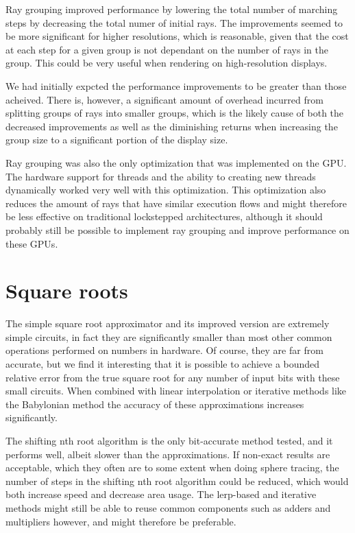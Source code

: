 			Ray grouping improved performance by lowering the total number of
			marching steps by decreasing the total numer of initial rays. The
			improvements seemed to be more significant for higher resolutions,
			which is reasonable, given that the cost at each step for a given
			group is not dependant on the number of rays in the group. This 
			could be very useful when rendering on high-resolution displays.
			
			We had initially expcted the performance improvements to be greater
			than those acheived. There is, however, a significant amount of
			overhead incurred from splitting groups of rays into smaller
			groups, which is the likely cause of both the decreased
			improvements as well as the diminishing returns when increasing the
			group size to a significant portion of the display size.

			Ray grouping was also the only optimization that was implemented on
			the GPU. The hardware support for threads and the ability to
			creating new threads dynamically worked very well with this
			optimization. This optimization also reduces the amount of rays
			that have similar execution flows and might therefore be less
			effective on traditional lockstepped architectures, although it
			should probably still be possible to implement ray grouping and
			improve performance on these GPUs.

	\section{Square roots}

		The simple square root approximator and its improved version are
		extremely simple circuits, in fact they are significantly smaller than
		most other common operations performed on numbers in hardware. Of
		course, they are far from accurate, but we find it interesting that it
		is possible to achieve a bounded relative error from the true square
		root for any number of input bits with these small circuits. When
		combined with linear interpolation or iterative methods like the
		Babylonian method the accuracy of these approximations increases
		significantly.
		
		The shifting nth root algorithm is the only bit-accurate method tested,
		and it performs well, albeit slower than the approximations. If
		non-exact results are acceptable, which they often are to some extent
		when doing sphere tracing, the number of steps in the shifting nth root
		algorithm could be reduced, which would both increase speed and
		decrease area usage. The lerp-based and iterative methods might still
		be able to reuse common components such as adders and multipliers
		however, and might therefore be preferable.
		
